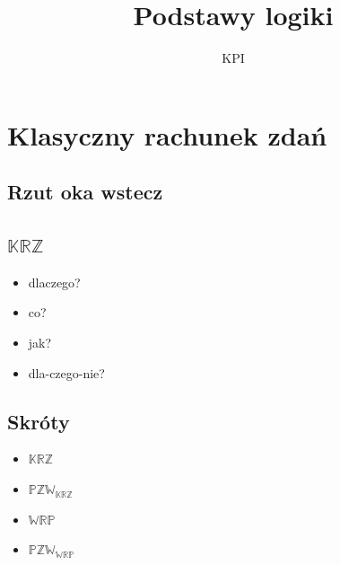 \documentclass[12pt]{article}
\newcommand {\KRZ} {\ensuremath{\mathbb{KRZ}}}
\newcommand {\PZWKRZ} {\ensuremath{\mathbb{PZW_{KRZ}}}}
\newcommand {\PZWWRP} {\ensuremath{\mathbb{PZW_{WRP}}}}
\newcommand {\WRP} {\ensuremath{\mathbb{WRP}}}
\begin{document}
\title{Podstawy logiki}
\author{KPI}



\maketitle
\tableofcontents



\section{Klasyczny rachunek zdań}

\subsection{Rzut oka wstecz}

\subsection{\KRZ}
%
    \begin{itemize}
        \item dlaczego?
        \item co?
        \item jak?
        \item dla-czego-nie?
    \end{itemize}
%

\subsection{Skróty}
\begin{itemize}
\item \KRZ
\item \PZWKRZ
\item \WRP
\item \PZWWRP
\end{itemize}
%
\end{document}
